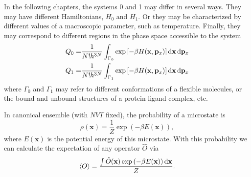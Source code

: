 In the following chapters, the systems 0 and 1 may differ in several ways. They may have different Hamiltonians, $H_0$ and $H_1$. Or they may be characterized by different values of a macroscopic parameter, such as temperature. Finally, they may correspond to different regions in the phase space accessible to the system
\begin{align}
Q_0=&\frac{1}{N!h^{3N}}\int_{\Gamma_0}\exp{\left[-\beta H(\mathbf{x},\mathbf{p}_x)\right]}\mathop{}\!\mathrm{d} \mathbf{x}\mathop{}\!\mathrm{d} \mathbf{p}_x\\
Q_1=&\frac{1}{N!h^{3N}}\int_{\Gamma_1}\exp{\left[-\beta H(\mathbf{x},\mathbf{p}_x)\right]}\mathop{}\!\mathrm{d} \mathbf{x}\mathop{}\!\mathrm{d}\mathbf{p}_x
\end{align}
where $\Gamma_0$ and $\Gamma_1$ may refer to different conformations of a flexible molecules, or the bound and unbound structures of a protein-ligand complex, etc.

In canonical ensemble (with $NVT$ fixed), the probability of a microstate is
\begin{equation}
\rho(\mathbf{x})=\frac{1}{Z}\exp{(-\beta E(\mathbf{x}))},
\end{equation}
where $E(\mathbf{x})$ is the potential energy of this microstate. With this probability we can calculate the expectation of any operator $\hat{O}$ via
\begin{equation}
\left<O\right>=\frac{\int \hat{O}(\mathbf{x})\exp{(-\beta E(\mathbf{x}))}\mathop{}\!\mathrm{d}\mathbf{x}}{Z}.
\end{equation}

